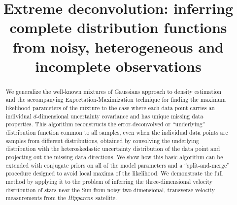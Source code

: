 \documentclass[aoas,preprint,authoryear,round]{imsart}
\newcommand{\Hipparcos}{\emph{Hipparcos}}
\begin{document}
\begin{frontmatter}
\title{Extreme deconvolution: inferring complete distribution
functions from noisy, heterogeneous and incomplete
observations} 




\begin{abstract}
We generalize the well-known mixtures of Gaussians approach to density
estimation and the accompanying Expectation-Maximization technique for
finding the maximum likelihood parameters of the mixture to the case
where each data point carries an individual $d$-dimensional
uncertainty covariance and has unique missing data properties. This
algorithm reconstructs the error-deconvolved or ``underlying''
distribution function common to all samples, even when the individual
data points are samples from different distributions, obtained by
convolving the underlying distribution with the heteroskedastic
uncertainty distribution of the data point and projecting out the
missing data directions. We show how this basic algorithm can be
extended with conjugate priors on all of the model parameters and a
``split-and-merge'' procedure designed to avoid local maxima of the
likelihood. We demonstrate the full method by applying it to the
problem of inferring the three-dimensional velocity distribution of
stars near the Sun from noisy two-dimensional, transverse velocity
measurements from the \Hipparcos\ satellite.
\end{abstract}



\end{frontmatter}
\end{document}
